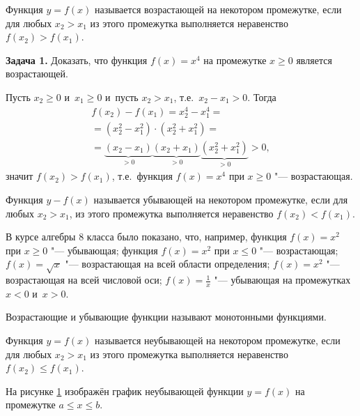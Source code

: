\begin{Def}
Функция $y = f(x)$ называется возрастающей на некотором промежутке,
если для любых $x_{2} > x_{1}$ из этого промежутка выполняется
неравенство $f(x_{2}) > f(x_{1})$.
\end{Def}

\textbf{Задача 1.}
Доказать, что функция $f(x) = x^{4}$ на промежутке $x \geqslant 0$
является возрастающей.

Пусть $x_{2} \geqslant 0$ и~$x_{1} \geqslant 0$ и~пусть $x_{2} > x_{1}$,
т.е.\ $x_{2} - x_{1} > 0$.
Тогда
\begin{multline*}
f(x_{2}) - f(x_{1}) = x_{2}^{4} - x_{1}^{4} = \\
=(x_{2}^{2} - x_{1}^{2}) \cdot (x_{2}^{2} + x_{1}^{2}) = \\
= 
\underbrace{(x_{2} - x_{1})}_{>0}
\underbrace{(x_{2} + x_{1})}_{>0}
\underbrace{(x_{2}^{2} + x_{1}^{2})}_{>0} > 0,
\end{multline*}
значит $f(x_{2}) > f(x_{1})$, т.е.\ функция $f(x) = x^{4}$
при $x \geqslant 0$ "--- возрастающая.

\begin{Def}
Функция $y - f(x)$ называется убывающей на некотором промежутке,
если для любых $x_{2} > x_{1}$, из этого промежутка выполняется неравенство
$f(x_{2}) < f(x_{1})$.
\end{Def}

В курсе алгебры 8 класса было показано, что, например,
функция $f(x) = x^{2}$ при $x \geqslant 0$ "--- убывающая;
функция $f(x) = x^{2}$ при $x \leqslant 0$ "--- возрастающая;
$f(x) = \sqrt{x}$ "--- возрастающая на всей области определения;
$f(x) = x^{2}$ "--- возрастающая на всей числовой оси;
$\displaystyle f(x) = \frac{1}{x}$ "--- убывающая на промежутках $x<0$ и~$x>0$.

Возрастающие и убывающие функции называют монотонными функциями.

\begin{Def}
Функция $y = f(x)$ называется неубывающей на некотором промежутке,
если для любых $x_{2} > x_{1}$ из этого промежутка выполняется
неравенство $f(x_{2}) \leqslant f(x_{1})$.
\end{Def}

На рисунке \ref{fig_1_6_13} изображён график неубывающей функции $y = f(x)$
на промежутке $a \leqslant x \leqslant b$.

\begin{figure}\label{fig_1_6_13}
\end{figure}

